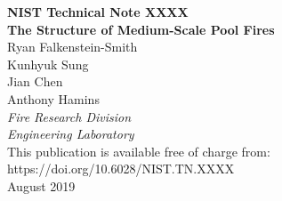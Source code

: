 \documentclass[12pt]{article}
\newcommand{\pubnumber}{XXXX}
\newcommand{\DOI}{https://doi.org/10.6028/NIST.TN.XXXX}
\newcommand{\monthyear}{August 2019}
\begin{document}
\begin{titlepage}
\begin{flushright}
\LARGE{\textbf{NIST Technical Note \pubnumber}}\\
\vfill
\Huge{\textbf{The Structure of Medium-Scale Pool Fires}}\\
\vfill
\normalsize Ryan Falkenstein-Smith\\
Kunhyuk Sung\\
Jian Chen\\
Anthony Hamins\\
\large
\textit{Fire Research Division}\\
\textit{Engineering Laboratory}\\
\vspace{12pt}
\vfill
\normalsize This publication is available free of charge from:\\
\DOI\\
\vfill
\normalsize \monthyear
\vfill


\end{flushright}
\end{titlepage}
\end{document}
